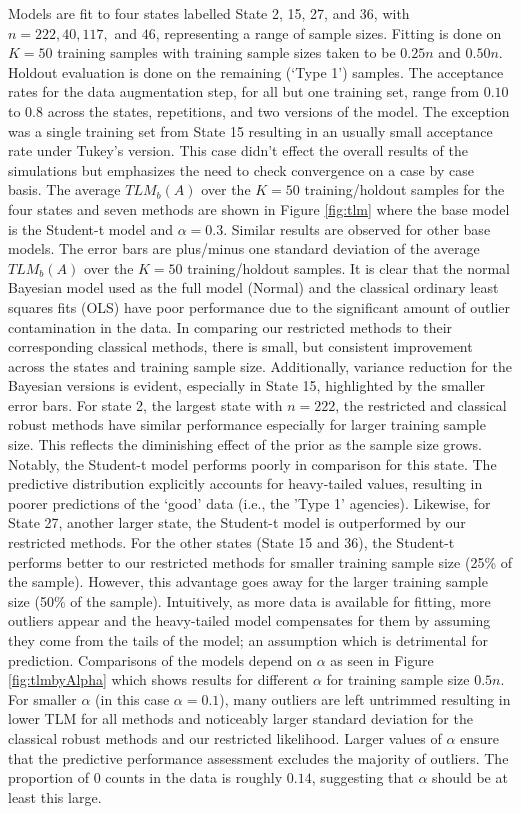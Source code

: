 \documentclass[ba]{imsart}
\newcommand{\response}[1]{{\color{blue}#1}}
\begin{document}
Models are fit to four states labelled State 2, 15, 27, and 36, with $n = 222, 40, 117,$ and $46$, representing a range of sample sizes. Fitting is done on $K = 50$ training samples with training sample sizes taken to be $0.25n$ and $0.50n$. Holdout evaluation is done on the remaining (`Type 1') samples. The acceptance rates for  the data augmentation step, \response{for all but one training set}, range from  \response{$0.10$ to $0.8$} across the states, repetitions, and two versions of the model. \response{The exception was a single training set from State 15 resulting in an usually small acceptance rate under Tukey's version. This case didn't effect the overall results of the simulations but emphasizes the need to check convergence on a case by case basis.} The average $TLM_b(A)$ over the $K = 50$ training/holdout samples for the four states and seven methods are shown in Figure \ref{fig:tlm} where the base model is the Student-t model and $\alpha = 0.3$. Similar results are observed for other base models. The error bars are plus/minus one standard deviation of the average $TLM_b(A)$ over the $K = 50$  training/holdout samples. It is clear that the normal Bayesian model used as the full model (Normal) and the classical ordinary least squares fits (OLS) have poor performance due to the significant amount of outlier contamination in the data. In comparing our restricted methods to their corresponding classical methods, there is small, but consistent improvement across the states and training sample size. Additionally, variance reduction for the Bayesian versions is evident, especially in State 15, highlighted by the smaller error bars. For state 2, the largest state with $n = 222$, the restricted and classical robust methods have similar performance especially for larger training sample size. This reflects the diminishing effect of the prior as the sample size grows. Notably, the Student-t model performs poorly in comparison for this state. The predictive distribution explicitly accounts for heavy-tailed values, resulting in poorer predictions of the `good' data (i.e., the 'Type 1' agencies). Likewise, for State 27, another larger state, the Student-t model is outperformed by our restricted methods.   For the other states (State 15 and 36), the Student-t performs better to our restricted methods for smaller training sample size (25\% of the sample). However, this advantage goes away for the larger training sample size (50\% of the sample). Intuitively, as more data is available for fitting, more outliers appear and the heavy-tailed model compensates for them by assuming they come from the tails of the model; an assumption which is detrimental for prediction. Comparisons of the models depend on $\alpha$ as seen in Figure \ref{fig:tlmbyAlpha} which shows results for different $\alpha$ for training sample size $0.5n$. For smaller $\alpha$ (in this case $\alpha = 0.1$), many outliers are left untrimmed resulting in lower TLM  for all methods and noticeably larger standard deviation for the classical robust methods and our restricted likelihood. Larger values of $\alpha$ ensure that the predictive performance assessment excludes the majority of outliers. The proportion of $0$ counts in the data is roughly $0.14$, suggesting that $\alpha$ should be at least this large. 
\end{document}
